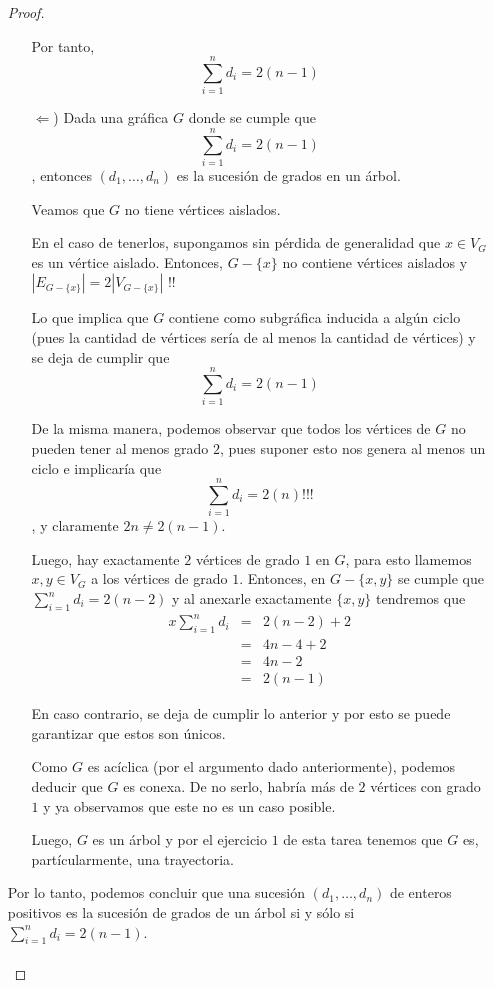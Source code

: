 \documentclass{article}
\begin{document}
\begin{enumerate}
\begin{proof}
\begin{itemize}
            Por tanto,
            \[
            \sum_{i=1}^n d_i = 2(n - 1)
            \]

          \item[$\Leftarrow$)] Dada una gr\'afica $G$ donde se cumple que
            $$\displaystyle \sum_{i=1}^n d_i = 2(n-1)$$
            , entonces $(d_1, \dots, d_n)$ es la sucesi\'on de grados en un \'arbol.

            Veamos que $G$ no tiene v\'ertices aislados.

            En el caso de tenerlos, supongamos sin p\'erdida de generalidad que
            $x \in V_G$ es un v\'ertice aislado. Entonces, $G - \{x\}$ no contiene
            v\'ertices aislados
            y $|E_{G - \{x\}}| = 2|V_{G - \{x\}}|$ !!

            Lo que implica que $G$ contiene como subgr\'afica inducida a alg\'un
            ciclo (pues la cantidad de v\'ertices ser\'ia de al menos la cantidad
            de v\'ertices) y se deja de cumplir que
            $$\displaystyle \sum_{i=1}^n d_i = 2(n-1)$$

            De la misma manera, podemos observar que todos los v\'ertices
            de $G$ no pueden tener al menos grado $2$, pues suponer esto nos genera
            al menos un ciclo e implicar\'ia que
            $$\displaystyle \sum_{i=1}^n d_i = 2(n) \text{!!!}$$
            , y claramente $2n \not= 2(n - 1)$.

            Luego, hay exactamente $2$ v\'ertices de grado $1$ en $G$, para esto
            llamemos $x, y \in V_G$ a los v\'ertices de grado $1$. Entonces, en
            $G -\{x, y\}$ se cumple que $\displaystyle \sum_{i=1}^n d_i = 2(n-2)$
            y al anexarle exactamente $\{x, y\}$ tendremos que
            \begin{eqnarray*}x
              \sum_{i=1}^n d_i &=& 2(n-2) + 2\\
              &=& 4n - 4 + 2\\
              &=& 4n - 2\\
              &=& 2(n - 1)
            \end{eqnarray*}

            En caso contrario, se deja de cumplir lo anterior y por esto
            se puede garantizar que estos son \'unicos.

            Como $G$ es ac\'iclica (por el argumento dado anteriormente), podemos
            deducir que $G$ es conexa. De no serlo, habr\'ia m\'as de $2$
            v\'ertices con grado $1$ y ya observamos que este no es un caso posible.

            Luego, $G$ es un \'arbol y por el ejercicio $1$ de esta tarea tenemos
            que $G$ es, part\'icularmente, una trayectoria.
        \end{itemize}
        Por lo tanto, podemos concluir que una sucesi\'on $(d_1, \dots,
        d_n)$ de enteros positivos es la sucesi\'on de grados de un \'arbol
        si y s\'olo si $\displaystyle \sum_{i=1}^n d_i = 2(n-1)$. \\
        \\
      \end{proof}
  \end{enumerate}
\end{document}
